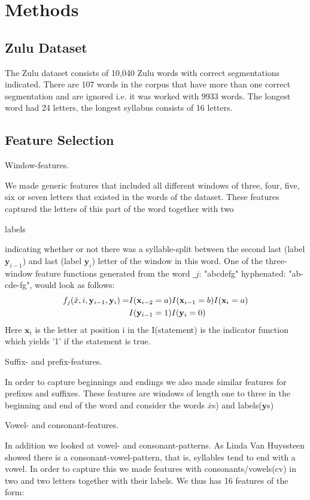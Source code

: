 \documentclass[10pt,twocolumn,letterpaper]{article}
\newcommand{\x}{\mathbf{x}}
\newcommand{\y}{\mathbf{y}}
\begin{document}
\section{Methods}
\subsection{Zulu Dataset}
The Zulu dataset consists of 10,040 Zulu words with correct segmentations indicated. There are 107 words in the corpus that have more than one correct segmentation and are ignored i.e. it was worked with 9933 words. The longest word had 24 letters, the longest syllabus consists of 16 letters. 

\subsection{Feature Selection}
\begin{em}Window-features.\end{em} We made generic features that included all different windows of three, four, five, six or seven letters that existed in the words of the dataset. These features captured the letters of this part of the word together with two \begin{em}labels\end{em} indicating whether or not there was a syllable-split between the second last (label $\y_{i-1}$) and last (label $\y_i$) letter of the window in this word. One of the three-window feature functions generated from the word $\_j$: "abcdefg" hyphenated: "ab-cde-fg", would look as follows:
\begin{align}
f_j(\bar{x},i,\y_{i-1},\y_i) =&I(\x_{i-2}=a)I(\x_{i-1}=b)I(\x_i=a)\notag\\
&I(\y_{i-1}=1)I(\y_i=0)
\end{align}
Here $\x_i$ is the letter at position i in the I(statement) is the indicator function which yields '1' if the statement is true.

\begin{em}Suffix- and prefix-features.\end{em}
In order to capture beginnings and endings we also made similar features for prefixes and suffixes. These features are windows of length one to three in the beginning and end of the word and consider the words $\bar{x}$s) and labels($\y$s)

\begin{em}Vowel- and consonant-features.\end{em}
In addition we looked at vowel- and consonant-patterns. As Linda Van Huyssteen \cite{huyssteen03} showed there is a consonant-vowel-pattern, that is, syllables tend to end with a vowel. In order to capture this we made features with consonants/vowels(cv) in two and two letters together with their labels. We thus has 16 features of the form:
\end{document}
